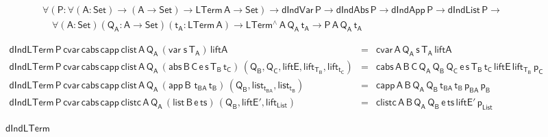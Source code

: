 \documentclass[9pt]{entcs}
\begin{document}
\vspace*{-0.225in}

\begin{equation}\label{eq:ind-lam}
\begin{array}{l}
\mathsf{\forall (P : \forall (A : Set) \to (A \to Set) \to LTerm\,A
  \to Set) \to dIndVar\,P \to dIndAbs\,P \to dIndApp\,P \to
  dIndList\,P \to} \\ \quad \mathsf{\forall (A : Set)(Q_A : A \to
  Set)(t_A : LTerm\,A) \to LTerm^{\wedge}\,A\,Q_A\,t_A \to
  P\,A\,Q_A\,t_A}
\end{array}
\end{equation}

\begin{figure*}[t]

  \begin{adjustbox}{varwidth=6.8in, max width=6.6in, margin=-0.1in 0in
      -0.2in 0in, fbox, center} 
{\small
\[\begin{array}{lll}
\mathsf{dIndLTerm \, P\, cvar \, cabs\, capp\, clist \, A\, Q_A\,
  (var\;s\,T_A) \, liftA} & = & \mathsf{cvar \, A\, Q_A\, s\, T_A\,
  liftA}\\ 
\mathsf{dIndLTerm \, P\, cvar \, cabs\, capp\, clist \, A\, Q_A\,
  (abs \,B \,C \,e \,s \,T_B \, t_C) \, (Q_B , Q_C , liftE,
  lift_{T_B}, lift_{t_C})} & = & \mathsf{cabs\,A\,B\,C\, Q_A\,
  Q_B\, Q_C\, e\, s\, T_B\, t_C\, liftE\, lift_{T_B}\, p_C}\\
\mathsf{dIndLTerm \, P\, cvar \, cabs\, capp\, clist \, A\, Q_A\,
    (app \,B \,\,t_{BA} \, t_B)\, (Q_B , list_{t_{BA}}, list_{t_B})} &
= & \mathsf{capp\,A\,B\,Q_A\, Q_B\, t_{BA}\, t_B\, p_{BA} \, p_B}\\
  \mathsf{dIndLTerm \, P\, cvar \, cabs\, capp\, clistc \, A\, Q_A\,
    (list \,B \,e \, ts) \, (Q_B , liftE', lift_{List})} & = & 
  \mathsf{clistc \,A\,B\,Q_A\, Q_B\, e\, ts\, liftE'\, p_{List} }
\end{array}\]}

\vspace*{-0.1in}

\caption{$\mathsf{dIndLTerm}$}\label{fig:dindlterm} \vspace*{0.1in} 
\end{adjustbox}
\end{figure*}

\vspace*{-0.125in}
\end{document}
